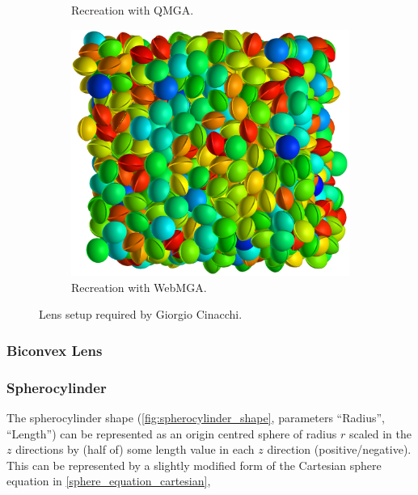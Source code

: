 \begin{figure}
\begin{center}
\begin{subfigure}{0.3\textwidth}
      \caption{Recreation with QMGA.}
      \label{fig:cinacchi_lens_qmga}
    \end{subfigure}
    \begin{subfigure}{0.3\textwidth}
      \includegraphics[width=\textwidth]{assets/images/webmga}
      \caption{Recreation with WebMGA.}
      \label{fig:cinacchi_lens_webmga}
    \end{subfigure}
  \end{center}
  \caption{Lens setup required by Giorgio Cinacchi.}
  \label{fig:cinacchi_lens}
\end{figure}

\subsubsection{Biconvex Lens}
\label{biconvex_section}

\subsubsection{Spherocylinder}
\label{spherocylinder_section}
The spherocylinder shape (\cref{fig:spherocylinder_shape}, parameters ``Radius'', ``Length'') can be represented as an origin centred sphere of radius $r$ scaled in the $z$ directions by (half of) some length value in each $z$ direction (positive/negative). This can be represented by a slightly modified form of the Cartesian sphere equation in \cref{sphere_equation_cartesian},

